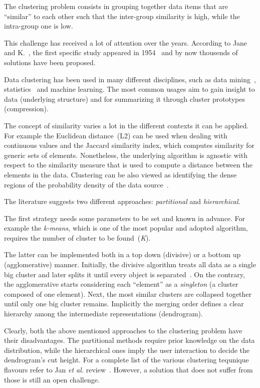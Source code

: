 \label{intro}
The clustering problem consists in grouping together data items that are ``similar'' to each other such that the inter-group similarity is high, while the intra-group one is low.

This challenge has received a lot of attention over the years.
According to Jane and K.~\cite{jain2010data}, the first specific study appeared in 1954~\cite{10.2307/2342679} and by now thousends of solutions have been proposed.

Data clustering has been used in many different disciplines, such as
data mining~\cite{fayyad1996advances}, statistics~\cite{tijms1994stochastic,banfield1993model} and machine learning.
The most common usages aim to gain insight to data (underlying structure) and for summarizing it through cluster prototypes (compression).

The concept of similarity varies a lot in the different contexts it can be applied.
For example the Euclidean distance~(L2) can be used when dealing with continuous values and the Jaccard similarity index, which computes similarity for generic sets of elements.
Nonetheless, the underlying algorithm is agnostic with respect to the similarity measure that is used to compute a distance between the elements in the data.
Clustering can be also viewed as identifying the dense regions of the probability density of the data source~\cite{bradley1998scaling}.

The literature suggests two different approaches: \emph{partitional} and \emph{hierarchical}.

The first strategy needs some parameters to be set and known in advance.
For example the \emph{k-means}, which is one of the most popular and adopted algorithm,
requires the number of cluster to be found~(\emph{K}).

The latter can be implemented both in a top down (divisive) or a bottom up (agglomerative) manner.
Initially, the divisive algorithm treats all data as a single big cluster and later splits it until every object is separated~\cite{kaufman2009finding}.
On the contrary, the agglomerative starts considering each ``element'' as a \emph{singleton} (a cluster composed of one element).
Next, the most similar clusters are collapsed together until only one big cluster remains.
Implicitly the merging order defines a clear hierarchy among the intermediate representations (dendrogram).

Clearly, both the above mentioned approaches to the clustering problem have their disadvantages.
The partitional methods require prior knowledge on the data distribution, while the hierarchical ones imply the user interaction to decide the dendrogram's cut height.
For a complete list of the various clustering tequnique flavours refer to Jan \emph{et al.} review~\cite{jain2010data}.
However, a solution that does not suffer from those is still an open challenge.

